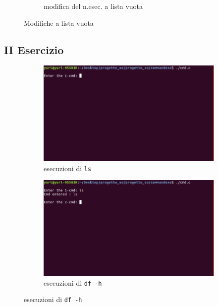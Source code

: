 \begin{figure}
\begin{subfigure}[b]{0.6\textwidth}
\caption{modifica del n.esec. a lista vuota}
\end{subfigure}
\caption{Modifiche a lista vuota}
\end{figure}

\subsection{II Esercizio}

\begin{figure}[!h]
\centering
\begin{subfigure}[b]{0.8\textwidth}
\includegraphics[width=\textwidth]{screencommand/1}
\caption{esecuzioni di \texttt{ls}}
\end{subfigure}
\begin{subfigure}[b]{0.8\textwidth}
\includegraphics[width=\textwidth]{screencommand/2}
\caption{esecuzioni di \texttt{df -h}}
\end{subfigure}
\end{figure}
